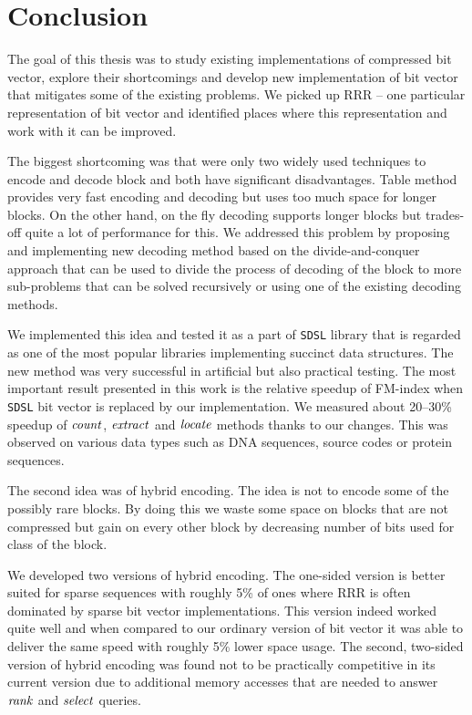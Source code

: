 \chapter*{Conclusion}  %

The goal of this thesis was to study existing implementations of compressed
bit vector, explore their shortcomings and develop new implementation of bit
vector that mitigates some of the existing problems. We picked up RRR -- one
particular representation of bit vector and identified places where this
representation and work with it can be improved. 

The biggest shortcoming was that were only two widely used techniques to
encode and decode block and both have significant disadvantages. Table method
provides very fast encoding and decoding but uses too much space for longer
blocks. On the other hand, on the fly decoding supports longer blocks but
trades-off quite a lot of performance for this. We addressed this problem by
proposing and implementing new decoding method based on the divide-and-conquer
approach that can be used to divide the process of decoding of the block to more
sub-problems that can be solved recursively or using one of the existing decoding
methods.

We implemented this idea and tested it as a part of \texttt{SDSL} library that is
regarded as one of the most popular libraries implementing succinct data structures.
The new method was very successful in artificial but also practical testing. The most
important result presented in this work is the relative speedup of FM-index when
\texttt{SDSL} bit vector is replaced by our implementation. We measured about 20--30\%
speedup of $\mathit{count}$, $\mathit{extract}$ and $\mathit{locate}$ methods thanks to our changes. This
was observed on various data types such as DNA sequences, source codes or protein sequences.

The second idea was of hybrid encoding. The idea is not to encode some of the possibly rare
blocks. By doing this we waste some space on blocks that are not compressed but gain
on every other block by decreasing number of bits used for class of the block.

We developed two versions of hybrid encoding. The one-sided version is better
suited for sparse sequences with roughly 5\% of ones where RRR is often dominated by sparse
bit vector implementations. This version indeed worked quite well and when compared to our
ordinary version of bit vector it was able to deliver the same
speed with roughly 5\% lower space usage. The second, two-sided version of hybrid encoding
was found not to be practically competitive in its current version due to additional memory
accesses that are needed to answer $\mathit{rank}$ and $\mathit{select}$ queries. 


